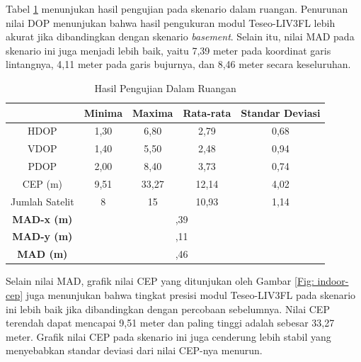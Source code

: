 Tabel \ref{Tab: indoor-table} menunjukan hasil pengujian pada skenario dalam ruangan. Penurunan nilai DOP menunjukan bahwa hasil pengukuran modul Teseo-LIV3FL lebih akurat jika dibandingkan dengan skenario \textit{basement}. Selain itu, nilai MAD pada skenario ini juga menjadi lebih baik, yaitu 7,39 meter pada koordinat garis lintangnya, 4,11 meter pada garis bujurnya, dan 8,46 meter secara keseluruhan.

\begin{table}[H]
	\caption{Hasil Pengujian Dalam Ruangan}
	\vspace{0.5em}
	\centering
	\begin{tabular}{ccccc}
		\hline
		& \textbf{Minima} & \textbf{Maxima} & \textbf{Rata-rata} & \textbf{Standar Deviasi}\\
		\hline 
		HDOP & 1,30 & 6,80 & 2,79 & 0,68\\
		VDOP & 1,40 & 5,50 & 2,48 & 0,94\\
		PDOP & 2,00 & 8,40 & 3,73 & 0,74\\
		CEP (m) & 9,51	& 33,27 & 12,14 & 4,02\\
		Jumlah Satelit & 8 & 15 & 10,93 & 1,14\\
		\hline
		\textbf{MAD-x (m)} & & \multicolumn{2}{c}{\centering 7,39} & \\
		\hline
		\textbf{MAD-y (m)} & & \multicolumn{2}{c}{\centering 4,11} & \\
		\hline
		\textbf{MAD (m)} & & \multicolumn{2}{c}{\centering 8,46} & \\
		\hline
	\end{tabular}
	\label{Tab: indoor-table}
\end{table}

Selain nilai MAD, grafik nilai CEP yang ditunjukan oleh Gambar \ref{Fig: indoor-cep} juga menunjukan bahwa tingkat presisi modul Teseo-LIV3FL pada skenario ini lebih baik jika dibandingkan dengan percobaan sebelumnya. Nilai CEP terendah dapat mencapai 9,51 meter dan paling tinggi adalah sebesar 33,27 meter. Grafik nilai CEP pada skenario ini juga cenderung lebih stabil yang menyebabkan standar deviasi dari nilai CEP-nya menurun. 

